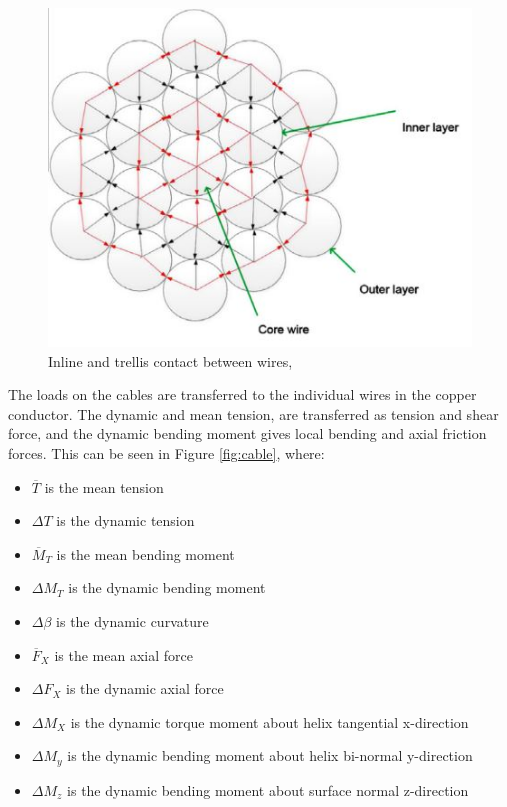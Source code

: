   \begin{figure}[H]
\centering
\includegraphics[scale=0.9]{figures/cross}
\caption[$\; \:$Inline and trellis contact between wires]{Inline and trellis contact between wires, \cite{Nasution2013} }
 \label{fig:cross}
\end{figure}

\noindent The loads on the cables are transferred to the individual wires in the copper conductor. The dynamic and mean tension, are transferred as tension and shear force, and the dynamic bending moment gives local bending and axial friction forces. This can be seen in Figure \ref{fig:cable}, where:
\begin{itemize}
    \item $\overline T$ is the mean tension
    \item $\Delta T$ is the dynamic tension
    \item $\overline M_T$ is the mean bending moment
    \item $\Delta M_T$ is the dynamic bending moment
    \item $\Delta \beta$ is the dynamic curvature
    \item $\overline F_X$ is the mean axial force
    \item $\Delta F_X$ is the dynamic axial force
    \item $\Delta M_X$ is the dynamic torque moment about helix tangential x-direction
    \item $\Delta M_y$ is the dynamic bending moment about helix bi-normal y-direction
    \item $\Delta M_z$ is the dynamic bending moment about surface normal z-direction
\end{itemize}


